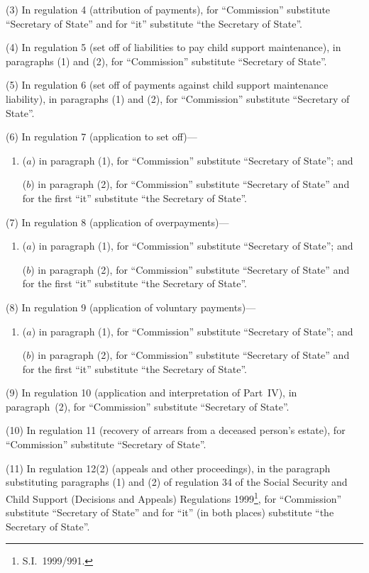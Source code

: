 \documentclass[12pt,a4paper]{article}
\begin{document}
(3) In regulation 4 (attribution of payments), for “Commission” substitute “Secretary of State” and for “it” substitute “the Secretary of State”.

(4) In regulation 5 (set off of liabilities to pay child support maintenance), in paragraphs (1) and (2), for “Commission” substitute “Secretary of State”.

(5) In regulation 6 (set off of payments against child support maintenance liability), in paragraphs (1) and (2), for “Commission” substitute “Secretary of State”.

(6) In regulation 7 (application to set off)—
\begin{enumerate}\item[]
($a$) in paragraph (1), for “Commission” substitute “Secretary of State”; and

($b$) in paragraph (2), for “Commission” substitute “Secretary of State” and for the first “it” substitute “the Secretary of State”.
\end{enumerate}

(7) In regulation 8 (application of overpayments)—
\begin{enumerate}\item[]
($a$) in paragraph (1), for “Commission” substitute “Secretary of State”; and

($b$) in paragraph (2), for “Commission” substitute “Secretary of State” and for the first “it” substitute “the Secretary of State”.
\end{enumerate}

(8) In regulation 9 (application of voluntary payments)—
\begin{enumerate}\item[]
($a$) in paragraph (1), for “Commission” substitute “Secretary of State”; and

($b$) in paragraph (2), for “Commission” substitute “Secretary of State” and for the first “it” substitute “the Secretary of State”.
\end{enumerate}

(9) In regulation 10 (application and interpretation of Part~IV), in paragraph~(2), for “Commission” substitute “Secretary of State”.

(10) In regulation 11 (recovery of arrears from a deceased person’s estate), for “Commission” substitute “Secretary of State”.

(11) In regulation 12(2) (appeals and other proceedings), in the paragraph substituting paragraphs (1) and (2) of regulation 34 of the Social Security and Child Support (Decisions and Appeals) Regulations 1999\footnote{S.I.~1999/991.}, for “Commission” substitute “Secretary of State” and for “it” (in both places) substitute “the Secretary of State”.
\end{document}
